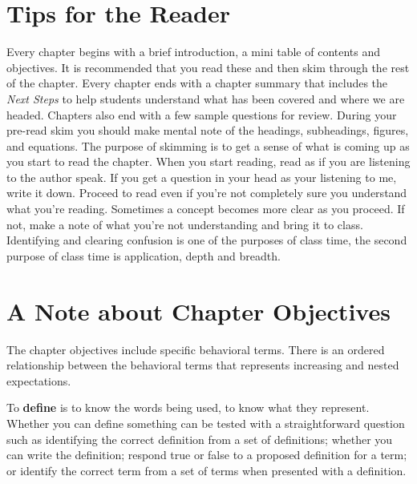 \tips

\section*{Tips for the Reader}
Every chapter begins with a brief introduction, a mini table of contents and objectives. It is recommended that you read these and then skim through the rest of the chapter. Every chapter ends with a chapter summary that includes the \textit{Next Steps} to help students understand what has been covered and where we are headed. Chapters also end with a few sample questions for review. During your pre-read skim you should make mental note of the headings, subheadings, figures, and equations. The purpose of skimming is to get a sense of what is coming up as you start to read the chapter. When you start reading, read as if you are listening to the author speak. If you get a question in your head as your listening to me, write it down. Proceed to read even if you're not completely sure you understand what you're reading. Sometimes a concept becomes more clear as you proceed. If not, make a note of what you're not understanding and bring it to class. Identifying and clearing confusion is one of the purposes of class time, the second purpose of class time is application, depth and breadth.

\section*{A Note about Chapter Objectives}

The chapter objectives include specific behavioral terms. There is an ordered relationship between the behavioral terms that represents increasing and nested expectations. 

To \textbf{define} is to know the words being used, to know what they represent. Whether you can define something can be tested with a straightforward question such as identifying the correct definition from a set of definitions; whether you can write the definition; respond true or false to a proposed definition for a term; or identify the correct term from a set of terms when presented with a definition. 

